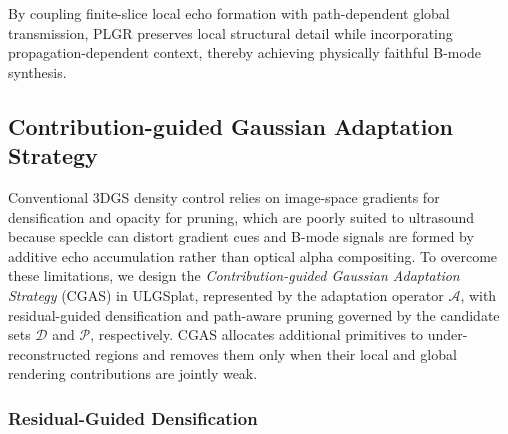 By coupling finite-slice local echo formation with path-dependent global
transmission, PLGR preserves local structural detail while incorporating
propagation-dependent context, thereby achieving physically faithful B-mode
synthesis.

\vspace{-4mm}
\subsection{Contribution-guided Gaussian Adaptation Strategy}
\label{sec:method:contribution-guided-gaussian-adaptation-strategy}

Conventional 3DGS density control relies on image-space gradients for
densification and opacity for pruning, which are poorly suited to ultrasound
because speckle can distort gradient cues and B-mode signals are formed by
additive echo accumulation rather than optical alpha compositing. To overcome
these limitations, we design the \emph{Contribution-guided Gaussian Adaptation
Strategy} (CGAS) in ULGSplat, represented by the adaptation operator
$\mathcal A$, with residual-guided densification and path-aware pruning
governed by the candidate sets $\mathcal D$ and $\mathcal P$, respectively.
CGAS allocates additional primitives to under-reconstructed regions and removes
them only when their local and global rendering contributions are jointly weak.

\subsubsection{Residual-Guided Densification}

